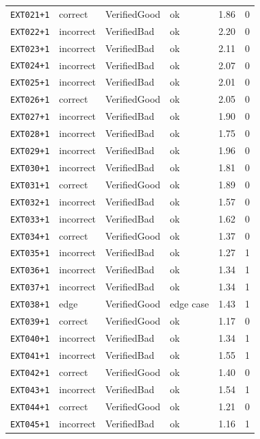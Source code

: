 \begin{longtable}{@{}l l l l r r@{}}
\texttt{EXT021{+}1} & correct & VerifiedGood & ok & 1.86 & 0 \\
\texttt{EXT022{+}1} & incorrect & VerifiedBad & ok & 2.20 & 0 \\
\texttt{EXT023{+}1} & incorrect & VerifiedBad & ok & 2.11 & 0 \\
\texttt{EXT024{+}1} & incorrect & VerifiedBad & ok & 2.07 & 0 \\
\texttt{EXT025{+}1} & incorrect & VerifiedBad & ok & 2.01 & 0 \\
\texttt{EXT026{+}1} & correct & VerifiedGood & ok & 2.05 & 0 \\
\texttt{EXT027{+}1} & incorrect & VerifiedBad & ok & 1.90 & 0 \\
\texttt{EXT028{+}1} & incorrect & VerifiedBad & ok & 1.75 & 0 \\
\texttt{EXT029{+}1} & incorrect & VerifiedBad & ok & 1.96 & 0 \\
\texttt{EXT030{+}1} & incorrect & VerifiedBad & ok & 1.81 & 0 \\
\texttt{EXT031{+}1} & correct & VerifiedGood & ok & 1.89 & 0 \\
\texttt{EXT032{+}1} & incorrect & VerifiedBad & ok & 1.57 & 0 \\
\texttt{EXT033{+}1} & incorrect & VerifiedBad & ok & 1.62 & 0 \\
\texttt{EXT034{+}1} & correct & VerifiedGood & ok & 1.37 & 0 \\
\texttt{EXT035{+}1} & incorrect & VerifiedBad & ok & 1.27 & 1 \\
\texttt{EXT036{+}1} & incorrect & VerifiedBad & ok & 1.34 & 1 \\
\texttt{EXT037{+}1} & incorrect & VerifiedBad & ok & 1.34 & 1 \\
\texttt{EXT038{+}1} & edge & VerifiedGood & edge case & 1.43 & 1 \\
\texttt{EXT039{+}1} & correct & VerifiedGood & ok & 1.17 & 0 \\
\texttt{EXT040{+}1} & incorrect & VerifiedBad & ok & 1.34 & 1 \\
\texttt{EXT041{+}1} & incorrect & VerifiedBad & ok & 1.55 & 1 \\
\texttt{EXT042{+}1} & correct & VerifiedGood & ok & 1.40 & 0 \\
\texttt{EXT043{+}1} & incorrect & VerifiedBad & ok & 1.54 & 1 \\
\texttt{EXT044{+}1} & correct & VerifiedGood & ok & 1.21 & 0 \\
\texttt{EXT045{+}1} & incorrect & VerifiedBad & ok & 1.16 & 1 \\

\end{longtable}

